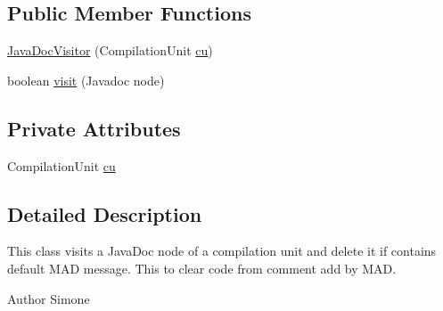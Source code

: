 \subsection*{Public Member Functions}
\begin{DoxyCompactItemize}
\item 
\hyperlink{classit_1_1isislab_1_1masonassisteddocumentation_1_1visitor_1_1_java_doc_visitor_acf45885f464485899c06f1572a018325}{Java\-Doc\-Visitor} (Compilation\-Unit \hyperlink{classit_1_1isislab_1_1masonassisteddocumentation_1_1visitor_1_1_java_doc_visitor_a89fac3d92c14e8f684fe42515dcd2088}{cu})
\item 
boolean \hyperlink{classit_1_1isislab_1_1masonassisteddocumentation_1_1visitor_1_1_java_doc_visitor_af7caf7cfb43e5000513f6f5a3431c9c8}{visit} (Javadoc node)
\end{DoxyCompactItemize}
\subsection*{Private Attributes}
\begin{DoxyCompactItemize}
\item 
Compilation\-Unit \hyperlink{classit_1_1isislab_1_1masonassisteddocumentation_1_1visitor_1_1_java_doc_visitor_a89fac3d92c14e8f684fe42515dcd2088}{cu}
\end{DoxyCompactItemize}


\subsection{Detailed Description}
This class visits a Java\-Doc node of a compilation unit and delete it if contains default M\-A\-D message. This to clear code from comment add by M\-A\-D. \begin{DoxyAuthor}{Author}
Simone 
\end{DoxyAuthor}


